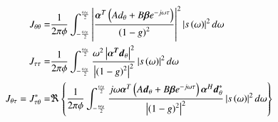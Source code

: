 \else
\fi
\begin{equation}
\label{eqn_FIM}
\begin{split}
    J_{\theta\theta}
    = &
    \frac{1}{2\pi\phi}
    \int_{-\frac{\omega_{s}}{2}}^{\frac{\omega_{s}}{2}}
    \left|
    \frac
    {
    \vecnot{\alpha}^{T}
    \left(
    Ad_{\theta} + B\vecnot{\beta}e^{-j\omega\tau}
    \right)
    }
    {\left(1-g\right)^{2}}
    \right|^{2}
    \left|
    s\left(\omega\right)
    \right|^{2}
    d\omega
    \\
    J_{\tau\tau}
    = &
    \frac{1}{2\pi\phi}
    \int_{-\frac{\omega_{s}}{2}}^{\frac{\omega_{s}}{2}}
    \frac
    {\omega^{2}
    \left|
    \vecnot{\alpha^{T}}\vecnot{d}_{\theta}
    \right|^{2}}
    {\left|\left(1-g\right)^{2}\right|^{2}}
    \left|
    s\left(\omega\right)
    \right|^{2}
    d\omega
    \\
    J_{\theta\tau} = J_{\tau\theta}^{*}
    = &
    \Re
    \left\{
    \frac{1}{2\pi\phi}
    \int_{-\frac{\omega_{s}}{2}}^{\frac{\omega_{s}}{2}}
    \frac
    {
    j\omega\vecnot{\alpha}^{T}
    \left(
    A\vecnot{d}_{\theta}+B\vecnot{\beta}e^{-j\omega\tau}
    \right)
    \vecnot{\alpha}^{H}\vecnot{d}^{*}_{\theta}
    }
    {\left|\left(1-g\right)^{2}\right|^{2}}
    \left|
    s\left(\omega\right)
    \right|^{2}
    d\omega
    \right\}
\end{split}
\end{equation}
\ifdefined\showDev
\else
\fi
